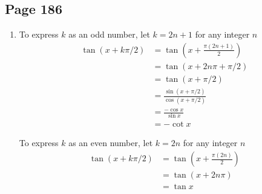 \documentclass{article}
\newenvironment{solutions}[1]
{\subsection*{#1}
 \begin{enumerate}[leftmargin=1.5em]}
{\end{enumerate}}
\newcommand{\solution}{\item}
\begin{document}
\begin{solutions}{Page 186}
\solution

To express $k$ as an odd number, let $k=2n+1$ for any integer $n$
\begin{align*}
    \tan \left( x+k\pi/2  \right) &= \tan \left( x+ \frac{\pi(2n+1)}{2}\right) \\
          &= \tan \left( x+ 2n\pi + \pi/2\right)\\
          &= \tan \left(x + \pi/2\right)\\
          &= \frac{\sin(x+\pi/2)}{\cos(x+\pi/2)}\\
          &= \frac{-\cos x}{\sin x}\\
          &= -\cot x
\end{align*}

To express $k$ as an even number, let $k=2n$ for any integer $n$
\begin{align*}
    \tan \left( x+k\pi/2  \right) &= \tan \left( x+ \frac{\pi(2n)}{2}\right) \\
          &= \tan \left( x+ 2n\pi \right)\\
          &= \tan x\\ 
\end{align*}

\end{solutions}
\end{document}
